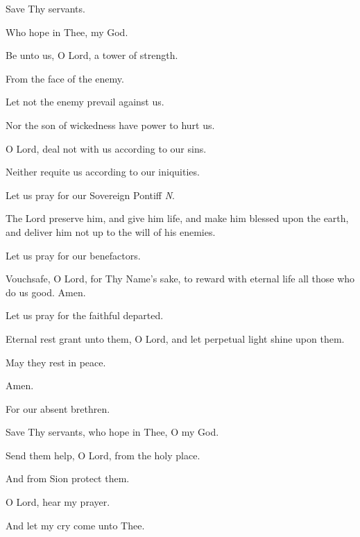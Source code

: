 \item Save Thy servants.
\item Who hope in Thee, my God.
\item Be unto us, O Lord, a tower of strength.
\item From the face of the enemy.
\item Let not the enemy prevail against us.
\item Nor the son of wickedness have power to hurt us.
\item O Lord, deal not with us according to our sins.
\item Neither requite us according to our iniquities.
\item Let us pray for our Sovereign Pontiff \emph{N}.
\item The Lord preserve him, and give him life, and make him blessed upon the earth, and deliver him not up to the will of his enemies.
\item Let us pray for our benefactors.
\item Vouchsafe, O Lord, for Thy Name's sake, to reward with eternal life all those who do us good. Amen.
\item Let us pray for the faithful departed.
\item Eternal rest grant unto them, O Lord, and let perpetual light shine upon them.
\item May they rest in peace.
\item Amen.
\item For our absent brethren.\\
\item Save Thy servants, who hope in Thee, O my God.
\item Send them help, O Lord, from the holy place.
\item And from Sion protect them.
\item O Lord, hear my prayer.
\item And let my cry come unto Thee.
